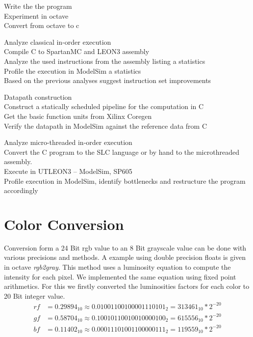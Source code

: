 \documentclass[a4paper]{scrartcl}
\begin{document}
	\begin{description}
		\item Write the the program \\
		Experiment in octave \\
		Convert from octave to c \\
		
		\item Analyze classical in-order execution \\
		Compile C to SpartanMC and LEON3 assembly \\
		Analyze the used instructions from the assembly listing a statistics \\
		Profile the execution in ModelSim a statistics \\
		Based on the previous analyses suggest instruction set improvements \\
		
		\item Datapath construction \\
		Construct a statically scheduled pipeline for the computation in C \\
		Get the basic function units from Xilinx Coregen \\
		Verify the datapath in ModelSim against the reference data from C\\
		
		\item Analyze micro-threaded in-order execution \\
		Convert the C program to the SLC language or by hand to the microthreaded assembly. \\
		Execute in UTLEON3 – ModelSim, SP605 \\
		Profile execution in ModelSim, identify bottlenecks and restructure the program accordingly \\
	\end{description}
	
	\section{Color Conversion}
	Conversion form a 24 Bit rgb value to an 8 Bit grayscale value can be done with various precisions and methods. A example using double precision floats is given in octave \textit{rgb2gray}. This method uses a luminosity equation to compute the intensity for each pixel. We implemented the same equation using fixed point arithmetics. For this we firstly converted the luminosities factors for each color to 20 Bit integer value.
	\begin{align*}
		rf &= 0.29894_{10} \approx  0.01001100100001110101_{2} = 313461_{10} * 2^{-20} \\
		gf &= 0.58704_{10} \approx  0.10010110010010000100_{2} = 615556_{10} * 2^{-20} \\
		bf &= 0.11402_{10} \approx  0.00011101001100000111_{2} = 119559_{10} * 2^{-20} \\
	\end{align*}
	
\end{document}
